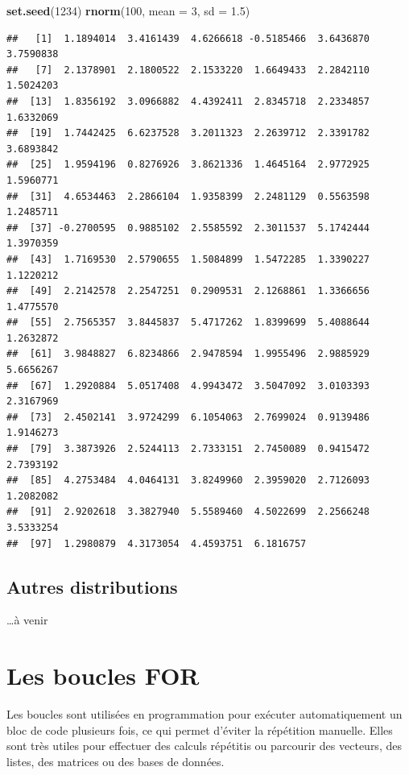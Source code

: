 \documentclass[
]{book}
\newenvironment{Shaded}{\begin{snugshade}}{\end{snugshade}}
\newcommand{\AttributeTok}[1]{\textcolor[rgb]{0.13,0.29,0.53}{#1}}
\newcommand{\DecValTok}[1]{\textcolor[rgb]{0.00,0.00,0.81}{#1}}
\newcommand{\FloatTok}[1]{\textcolor[rgb]{0.00,0.00,0.81}{#1}}
\newcommand{\FunctionTok}[1]{\textcolor[rgb]{0.13,0.29,0.53}{\textbf{#1}}}
\newcommand{\NormalTok}[1]{#1}
\begin{document}
\begin{Shaded}
\begin{Highlighting}[]
\FunctionTok{set.seed}\NormalTok{(}\DecValTok{1234}\NormalTok{)  }
\FunctionTok{rnorm}\NormalTok{(}\DecValTok{100}\NormalTok{, }\AttributeTok{mean =} \DecValTok{3}\NormalTok{, }\AttributeTok{sd =} \FloatTok{1.5}\NormalTok{) }
\end{Highlighting}
\end{Shaded}

\begin{verbatim}
##   [1]  1.1894014  3.4161439  4.6266618 -0.5185466  3.6436870  3.7590838
##   [7]  2.1378901  2.1800522  2.1533220  1.6649433  2.2842110  1.5024203
##  [13]  1.8356192  3.0966882  4.4392411  2.8345718  2.2334857  1.6332069
##  [19]  1.7442425  6.6237528  3.2011323  2.2639712  2.3391782  3.6893842
##  [25]  1.9594196  0.8276926  3.8621336  1.4645164  2.9772925  1.5960771
##  [31]  4.6534463  2.2866104  1.9358399  2.2481129  0.5563598  1.2485711
##  [37] -0.2700595  0.9885102  2.5585592  2.3011537  5.1742444  1.3970359
##  [43]  1.7169530  2.5790655  1.5084899  1.5472285  1.3390227  1.1220212
##  [49]  2.2142578  2.2547251  0.2909531  2.1268861  1.3366656  1.4775570
##  [55]  2.7565357  3.8445837  5.4717262  1.8399699  5.4088644  1.2632872
##  [61]  3.9848827  6.8234866  2.9478594  1.9955496  2.9885929  5.6656267
##  [67]  1.2920884  5.0517408  4.9943472  3.5047092  3.0103393  2.3167969
##  [73]  2.4502141  3.9724299  6.1054063  2.7699024  0.9139486  1.9146273
##  [79]  3.3873926  2.5244113  2.7333151  2.7450089  0.9415472  2.7393192
##  [85]  4.2753484  4.0464131  3.8249960  2.3959020  2.7126093  1.2082082
##  [91]  2.9202618  3.3827940  5.5589460  4.5022699  2.2566248  3.5333254
##  [97]  1.2980879  4.3173054  4.4593751  6.1816757
\end{verbatim}

\section{Autres distributions}\label{autres-distributions}

\ldots à venir

\chapter{Les boucles FOR}\label{les-boucles-for}

Les boucles sont utilisées en programmation pour exécuter automatiquement un bloc de code plusieurs fois, ce qui permet d'éviter la répétition manuelle. Elles sont très utiles pour effectuer des calculs répétitis ou parcourir des vecteurs, des listes, des matrices ou des bases de données.
\end{document}
